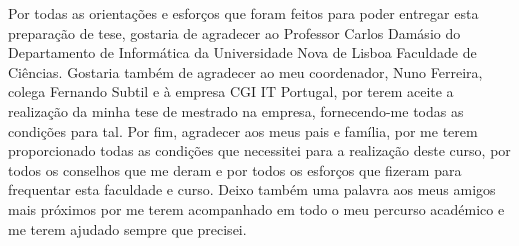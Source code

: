 


\begin{ntacknowledgements}

Por todas as orientações e esforços que foram feitos para poder entregar esta preparação de tese, gostaria de agradecer ao Professor Carlos Damásio do Departamento de Informática da Universidade Nova de Lisboa Faculdade de Ciências. Gostaria também de agradecer ao meu coordenador, Nuno Ferreira, colega Fernando Subtil e à empresa CGI IT Portugal, por terem aceite a realização da minha tese de mestrado na empresa, fornecendo-me todas as condições para tal. Por fim, agradecer aos meus pais e família, por me terem proporcionado todas as condições que necessitei para a realização deste curso, por todos os conselhos que me deram e por todos os esforços que fizeram para frequentar esta faculdade e curso. Deixo também uma palavra aos meus amigos mais próximos por me terem acompanhado em todo o meu percurso académico e me terem ajudado sempre que precisei.

\end{ntacknowledgements}